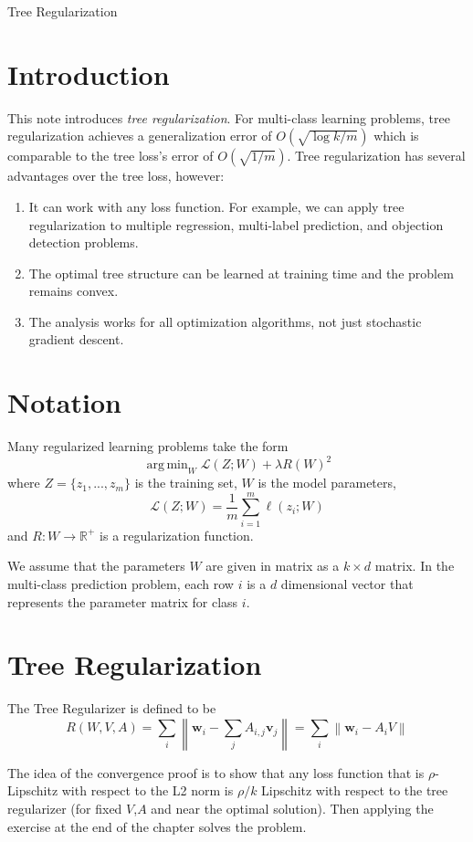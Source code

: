 \documentclass[10pt]{article}
\theoremstyle{definition}
\newcommand{\R}{\mathbb R}
\DeclareMathOperator*{\argmin}{arg\,min}
\newcommand{\loss}{\ell}
\newcommand{\Loss}{\mathcal{L}}
\newcommand{\vv}{\mathbf v}
\newcommand{\w}{\mathbf w}
\begin{document}
\begin{center}
\Huge
Tree Regularization
\end{center}

\section{Introduction}

This note introduces \emph{tree regularization}.
For multi-class learning problems, tree regularization achieves a generalization error of $O(\sqrt{\log k / m})$ which is comparable to the tree loss's error of $O(\sqrt{1/m})$.
Tree regularization has several advantages over the tree loss, however:
\begin{enumerate}
    \item
        It can work with any loss function.
        For example, we can apply tree regularization to multiple regression, multi-label prediction, and objection detection problems.
    \item
        The optimal tree structure can be learned at training time and the problem remains convex.
    \item
        The analysis works for all optimization algorithms, not just stochastic gradient descent.
\end{enumerate}

\section{Notation}
Many regularized learning problems take the form
\begin{equation}
    \argmin_{W} \Loss(Z ; W) + \lambda R(W)^2
\end{equation}
where
$Z = \{z_1, ..., z_m\}$ is the training set,
$W$ is the model parameters,
\begin{equation}
    \Loss(Z ; W) = \frac 1m \sum_{i=1}^m \loss(z_i; W)
\end{equation}
and $R : W \to \R^+$ is a regularization function.

We assume that the parameters $W$ are given in matrix as a $k \times d$ matrix.
In the multi-class prediction problem,
each row $i$ is a $d$ dimensional vector that represents the parameter matrix for class $i$.

\section{Tree Regularization}

The Tree Regularizer is defined to be
\begin{equation}
    R(W, V, A) 
    = \sum_{i} \left\lVert \w_i - \sum_{j}A_{i,j} \vv_j \right\lVert
    = \sum_{i} \left\lVert \w_i - A_i V \right\lVert
\end{equation}

The idea of the convergence proof is to show that any loss function that is $\rho$-Lipschitz with respect to the L2 norm is $\rho/k$ Lipschitz with respect to the tree regularizer (for fixed $V$,$A$ and near the optimal solution).
Then applying the exercise at the end of the chapter solves the problem.
\end{document}

